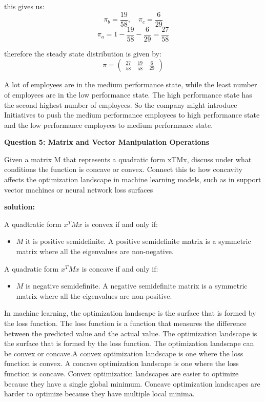 \documentclass{article}
\begin{document}
this gives us:
\[\pi_b = \frac{19}{58}, \quad \pi_c = \frac{6}{29}\]
\[\pi_a = 1 - \frac{19}{58} - \frac{6}{29} = \frac{27}{58}\]

therefore the steady state distribution is given by:
\[\pi = \begin{pmatrix}\frac{27}{58}&\frac{19}{58}&\frac{6}{29}\end{pmatrix}\]


A lot of employees are in the medium performance state, while the least number of employees are in the low performance state. The high performance state has the second highest number of employees. So the company might introduce Initiatives to push the medium performance employees to high performance state and the low performance employees to medium performance state.

\begin{center}
    \large \textbf{Question 5: Matrix and Vector Manipulation Operations}
\end{center}

Given a matrix M that represents a quadratic form xTMx, discuss under what conditions the function is
concave or convex. Connect this to how concavity affects the optimization landscape in machine learning
models, such as in support vector machines or neural network loss surfaces

\textbf{solution:}

A quadtratic form \(x^T M  x\) is convex if and only if:\newline

\begin{itemize}
    \item \(M\) it is positive semidefinite. A positive semidefinite matrix is a symmetric matrix where all the eigenvalues are non-negative.\newline
\end{itemize}

A quadratic form \(x^T M  x\) is concave if and only if:\newline
\begin{itemize}
    \item \(M\) is negative semidefinite. A negative semidefinite matrix is a symmetric matrix where all the eigenvalues are non-positive.\newline
\end{itemize}

In machine learning, the optimization landscape is the surface that is formed by the loss function. The loss function is a function that measures the difference between the predicted value and the actual value. The optimization landscape is the surface that is formed by the loss function. The optimization landscape can be convex or concave.\newline A convex optimization landscape is one where the loss function is convex. A concave optimization landscape is one where the loss function is concave. Convex optimization landscapes are easier to optimize because they have a single global minimum. Concave optimization landscapes are harder to optimize because they have multiple local minima. 
\end{document}
